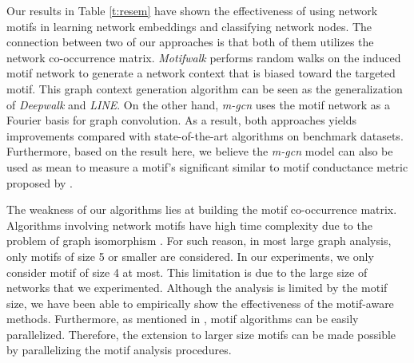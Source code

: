 \documentclass{article}
\theoremstyle{definition}
\begin{document}
Our results in Table \ref{t:resem} have shown the effectiveness of using network
motifs in learning network embeddings and classifying network nodes. The connection
between two of our approaches is that both of them utilizes the network
co-occurrence matrix. \emph{Motifwalk} performs random walks on the induced motif
network to generate a network context that is biased toward the targeted motif.
This graph context
generation algorithm can be seen as the generalization of \emph{Deepwalk} and
\emph{LINE}. On the other hand, \emph{m-gcn} uses the motif network as a Fourier
basis for graph convolution. As a result, both approaches yields improvements
compared with state-of-the-art algorithms on benchmark datasets. Furthermore, based
on the result here, we believe the \emph{m-gcn} model can also be used as mean to
measure a motif's significant similar to motif conductance metric proposed by
\citeauthor{juremotif}.

The weakness of our algorithms lies at building the motif co-occurrence matrix.
Algorithms involving network motifs have high time complexity due to
the problem of graph isomorphism \cite{motifdecrev}.
For such reason, in most large graph
analysis, only motifs of size 5 or smaller are considered. In our
experiments, we only consider motif of size 4 at most. This limitation is
due to the large size of networks that we experimented. Although the
analysis is limited by the motif size, we have been able to empirically
show the effectiveness of the motif-aware methods. Furthermore, as
mentioned in \cite{juremotif}, motif algorithms can be easily
parallelized. Therefore, the extension to larger size motifs can be made
possible by parallelizing the motif analysis procedures.



\end{document}
